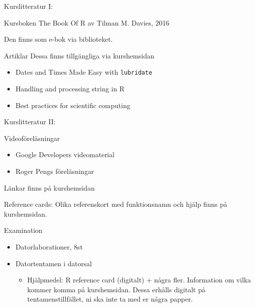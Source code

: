\documentclass[
  10pt,
  ignorenonframetext,
]{beamer}
\providecommand{\tightlist}{%
  \setlength{\itemsep}{0pt}\setlength{\parskip}{0pt}}
\begin{document}
\begin{frame}{Kurslitteratur I:}
\protect\hypertarget{kurslitteratur-i}{}
\begin{block}{Kursboken}
\protect\hypertarget{kursboken}{}
The Book Of R av Tilman M. Davies, 2016

Den finns som e-bok via biblioteket.
\end{block}

\begin{block}{Artiklar}
\protect\hypertarget{artiklar}{}
Dessa finns tillgängliga via kurshemsidan

\begin{itemize}
\tightlist
\item
  Dates and Times Made Easy with \texttt{lubridate}
\item
  Handling and processing string in R
\item
  Best practices for scientific computing
\end{itemize}
\end{block}
\end{frame}

\begin{frame}{Kurslitteratur II:}
\protect\hypertarget{kurslitteratur-ii}{}
\begin{block}{Videoföreläsningar}
\protect\hypertarget{videofuxf6reluxe4sningar}{}
\begin{itemize}
\tightlist
\item
  Google Developers videomaterial
\item
  Roger Pengs föreläsningar
\end{itemize}

Länkar finns på kurshemsidan
\end{block}

\begin{block}{Reference cards:}
\protect\hypertarget{reference-cards}{}
Olika referenskort med funktionsnamn och hjälp finns på kurshemsidan.
\end{block}
\end{frame}

\begin{frame}{Examination}
\protect\hypertarget{examination}{}
\begin{itemize}
\tightlist
\item
  Datorlaborationer, 8st
\item
  Datortentamen i datorsal

  \begin{itemize}
  \tightlist
  \item
    Hjälpmedel: R reference card (digitalt) + några fler. Information om
    vilka kommer komma på kurshemsidan. Dessa erhålls digitalt på
    tentamenstillfället, ni ska inte ta med er några papper.
  \end{itemize}
\end{itemize}
\end{frame}
\end{document}
